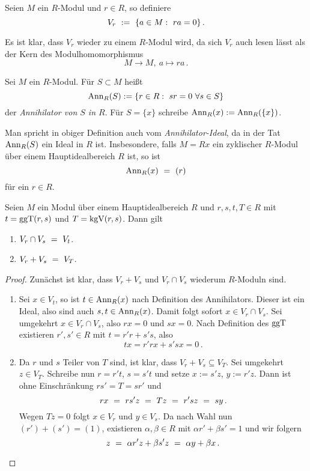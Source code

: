 \begin{definition}
  \label{def:V_r}
  Seien $M$ ein $R$-Modul und $r \in R$, so definiere
  \[ V_r \ :=\  \{ a\in M:\ ra = 0\}\,.\]
\end{definition}


\begin{bemerkung}
  Es ist klar, dass $V_r$ wieder zu einem $R$-Modul wird, da sich $V_r$ auch
  lesen lässt als der Kern des Modulhomomorphismus
  \[ M\to M,\ a \mapsto ra\,.\]
\end{bemerkung}


\begin{definition}[Annihilator]
  \label{def:annihilator}
  Sei $M$ ein $R$-Modul. Für $S\subset M$ heißt
  \[ \Ann_R(S) := \{ r \in R:\ sr = 0\ \forall s\in S\}\]
  der \emph{Annihilator von $S$ in $R$}. 
  Für $S= \{x\}$ schreibe $\operatorname{Ann}_R(x) := \operatorname{Ann}_R(\{x\})$.
\end{definition}

\begin{bemerkung}
  Man spricht in obiger Definition auch vom \emph{Annihilator-Ideal}, da in der
  Tat $\operatorname{Ann}_R(S)$ ein Ideal in $R$ ist. Insbesondere, falls 
  $M = Rx$ ein zyklischer $R$-Modul über einem Hauptidealbereich $R$ ist, so
  ist 
  \[ \operatorname{Ann}_R(x) \ =\  (r)\]
  für ein $r\in R$.
\end{bemerkung}

\begin{satz}
  \label{satz:schnitt_plus_vs}
  Seien $M$ ein Modul über einem Hauptidealbereich $R$ und $r,s,t,T\in R$ mit 
  $t = \operatorname{ggT}(r,s)$ und $T = \operatorname{kgV}(r,s)$. Dann gilt
  \begin{enumerate}
    \item $V_r \cap V_s \ =\  V_t$.
    \item $V_r + V_s \ =\  V_T$.
  \end{enumerate}
\end{satz}
\begin{proof}
  Zunächst ist klar, dass $V_r+V_s$ und $V_r\cap V_s$ wiederum $R$-Moduln sind.
  \begin{enumerate}
    \item Sei $x\in V_t$, so ist $t \in \operatorname{Ann}_R(x)$ nach Definition des
      Annihilators. Dieser ist ein Ideal, also sind auch $s,t\in \operatorname{Ann}_R(x)$.
      Damit folgt sofort $x \in V_r\cap V_s$.
      Sei umgekehrt $x \in V_r \cap V_s$, also $rx = 0$ und $sx = 0$. 
      Nach Definition des $\operatorname{ggT}$ existieren $r',s'\in R$ mit 
      $t = r'r + s's$, also 
      \[ tx = r'rx + s'sx = 0\,.\]
    \item Da $r$ und $s$ Teiler von $T$ sind, ist klar, dass
      $V_r+V_s \subseteq V_T$. Sei umgekehrt $z\in V_T$.
      Schreibe nun $r = r't$, $s = s't$ und setze
      $x := s'z$, $y:=r'z$. Dann ist 
      ohne Einschränkung $rs'=T=sr'$ und 
      \[ rx \ =\  rs'z \ =\  Tz \ =\  r'sz \ =\  sy\,. \]
      Wegen $Tz = 0$ folgt $x\in V_r$ und $y \in V_s$. Da nach Wahl nun
      $(r')+(s') = (1)$, existieren $\alpha,\beta\in R$ mit 
      $\alpha r' + \beta s' = 1$ und wir folgern
      \[ z \ =\  \alpha r'z + \beta s'z \ =\  \alpha y + \beta x \,.\]
  \end{enumerate}
\end{proof}


